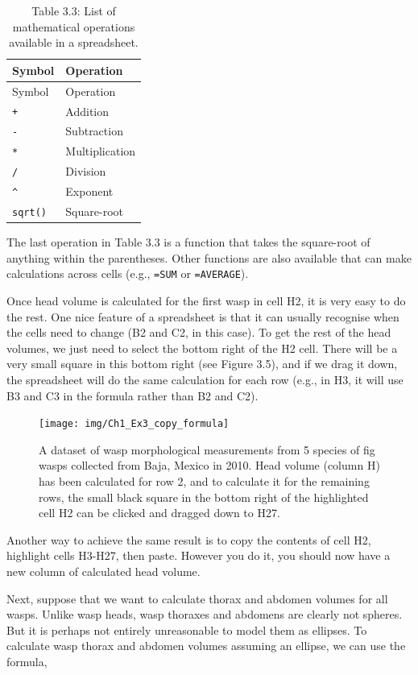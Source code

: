 \documentclass[
  openany]{scrbook}
\begin{document}
\begin{longtable}[]{@{}ll@{}}
\caption{Table 3.3: List of mathematical operations available in a spreadsheet.}\tabularnewline
\toprule
Symbol & Operation \\
\midrule
\endfirsthead
\toprule
Symbol & Operation \\
\midrule
\endhead
\texttt{+} & Addition \\
\texttt{-} & Subtraction \\
\texttt{*} & Multiplication \\
\texttt{/} & Division \\
\texttt{\^{}} & Exponent \\
\texttt{sqrt()} & Square-root \\
\bottomrule
\end{longtable}

The last operation in Table 3.3 is a function that takes the square-root of anything within the parentheses.
Other functions are also available that can make calculations across cells (e.g., \texttt{=SUM} or \texttt{=AVERAGE}).

Once head volume is calculated for the first wasp in cell H2, it is very easy to do the rest.
One nice feature of a spreadsheet is that it can usually recognise when the cells need to change (B2 and C2, in this case).
To get the rest of the head volumes, we just need to select the bottom right of the H2 cell.
There will be a very small square in this bottom right (see Figure 3.5), and if we drag it down, the spreadsheet will do the same calculation for each row (e.g., in H3, it will use B3 and C3 in the formula rather than B2 and C2).

\begin{figure}
\texttt{[image: img/Ch1\_Ex3\_copy\_formula]} \caption{A dataset of wasp morphological measurements from 5 species of fig wasps collected from Baja, Mexico in 2010. Head volume (column H) has been calculated for row 2, and to calculate it for the remaining rows, the small black square in the bottom right of the highlighted cell H2 can be clicked and dragged down to H27.}\label{fig:unnamed-chunk-20}
\end{figure}

Another way to achieve the same result is to copy the contents of cell H2, highlight cells H3-H27, then paste.
However you do it, you should now have a new column of calculated head volume.

Next, suppose that we want to calculate thorax and abdomen volumes for all wasps.
Unlike wasp heads, wasp thoraxes and abdomens are clearly not spheres.
But it is perhaps not entirely unreasonable to model them as ellipses.
To calculate wasp thorax and abdomen volumes assuming an ellipse, we can use the formula,
\end{document}
